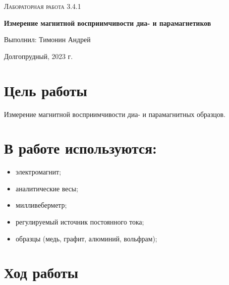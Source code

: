 \documentclass[a4paper]{article}
\begin{document}
\begin{titlepage}
	\centering
	\vspace{5cm}
	\vspace{4cm}
	{\scshape\Large Лабораторная работа 3.4.1\par}
	\vspace{1cm}
	{\huge\bfseries Измерение магнитной восприимчивости диа- и парамагнетиков\par}
	\vspace{1cm}
	\vfill
\begin{flushright}
	\vspace{0.3cm}
	{\LARGE Выполнил: Тимонин Андрей}
\end{flushright}
	

	\vfill

	Долгопрудный, 2023 г.
\end{titlepage}

\section{Цель работы}

Измерение магнитной восприимчивости диа- и парамагнитных образцов.

\section{В работе используются:}
\begin{itemize}
    \item электромагнит;
    \item аналитические весы;
    \item милливеберметр;
    \item регулируемый источник постоянного тока;
    \item образцы (медь, графит, алюминий, вольфрам);
\end{itemize}

\section{Ход работы}
\end{document}
